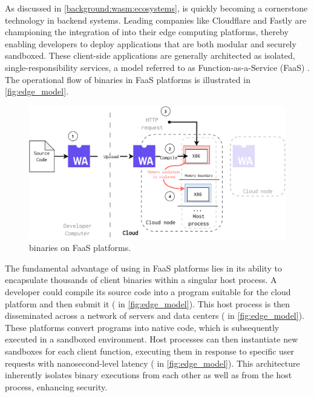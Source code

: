 


As discussed in \autoref{background:wasm:ecosystems}, \Wasm is quickly becoming a cornerstone technology in backend systems. 
Leading companies like Cloudflare and Fastly are championing the integration of \Wasm into their edge computing platforms, thereby enabling developers to deploy applications that are both modular and securely sandboxed. 
These client-side \Wasm applications are generally architected as isolated, single-responsibility services, a model referred to as Function-as-a-Service (FaaS) \cite{pMendkiServerless, 1244493Jacobsson}. 
The operational flow of \Wasm binaries in FaaS platforms is illustrated in \autoref{fig:edge_model}.

\begin{figure}[h]
    \centering
    \includegraphics[width=0.8\linewidth]{figures/edge.pdf}
    \caption{\Wasm binaries on FaaS platforms.}
    \label{fig:edge_model}
\end{figure}

The fundamental advantage of using \Wasm in FaaS platforms lies in its ability to encapsulate thousands of client \Wasm binaries within a singular host process.
A developer could compile its source code into a \Wasm program suitable for the cloud platform and then submit it ( in \autoref{fig:edge_model}).
This host process is then disseminated across a network of servers and data centers ( in \autoref{fig:edge_model}). 
These platforms convert \Wasm programs into native code, which is subsequently executed in a sandboxed environment. 
Host processes can then instantiate new \Wasm sandboxes for each client function, executing them in response to specific user requests with nanosecond-level latency ( in \autoref{fig:edge_model}). 
This architecture inherently isolates \Wasm binary executions from each other as well as from the host process, enhancing security.

